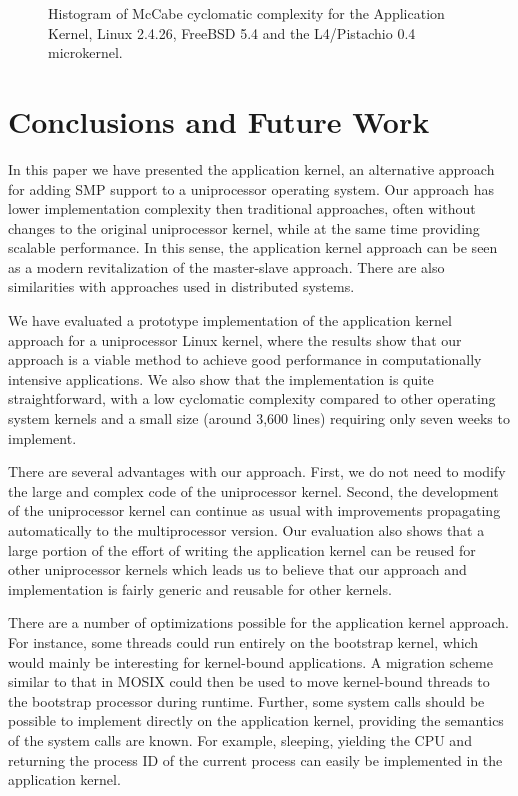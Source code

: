 \begin{figure}
  \centering
  \caption[Histogram of McCabe cyclomatic complexity]{Histogram of McCabe cyclomatic complexity for the Application
    Kernel, Linux 2.4.26, FreeBSD 5.4 and the L4/Pistachio 0.4 microkernel.}
  \label{fig:mccabe}
\end{figure}

\section{Conclusions and Future Work}
\label{sec:appkern:conclusion}

In this paper we have presented the application kernel, an alternative
approach for adding SMP support to a uniprocessor operating system. Our
approach has lower implementation complexity then traditional approaches,
often without changes to the original uniprocessor kernel, while at the same
time providing scalable performance. In this sense, the application kernel
approach can be seen as a modern revitalization of the master-slave approach.
There are also similarities with approaches used in distributed systems.

We have evaluated a prototype implementation of the application kernel
approach for a uniprocessor Linux kernel, where the results show that our
approach is a viable method to achieve good performance in computationally
intensive applications. We also show that the implementation is quite
straightforward, with a low cyclomatic complexity compared to other operating
system kernels and a small size (around 3,600 lines) requiring only seven
weeks to implement.

There are several advantages with our approach. First, we do not need to
modify the large and complex code of the uniprocessor kernel.  Second, the
development of the uniprocessor kernel can continue as usual with improvements
propagating automatically to the multiprocessor version. Our evaluation also
shows that a large portion of the effort of writing the application kernel can
be reused for other uniprocessor kernels which leads us to believe that our
approach and implementation is fairly generic and reusable for other kernels.

There are a number of optimizations possible for the application kernel
approach. For instance, some threads could run entirely on the bootstrap
kernel, which would mainly be interesting for kernel-bound applications. A
migration scheme similar to that in MOSIX could then be used to
move kernel-bound threads to the bootstrap processor during runtime. Further,
some system calls should be possible to implement directly on the application
kernel, providing the semantics of the system calls are known. For example,
sleeping, yielding the CPU and returning the process ID of the current process
can easily be implemented in the application kernel.

